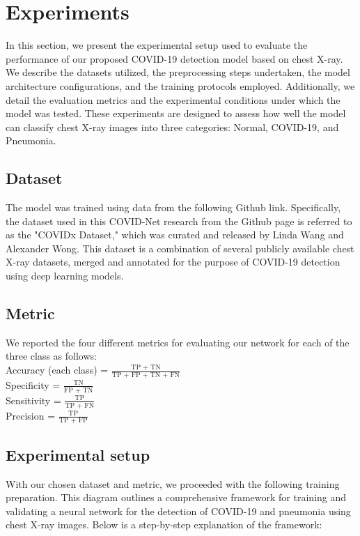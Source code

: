 \documentclass[12pt]{article}
\begin{document}
\section{Experiments}
In this section, we present the experimental setup used to evaluate the performance of our proposed COVID-19 detection model based on chest X-ray. We describe the datasets utilized, the preprocessing steps undertaken, the model architecture configurations, and the training protocols employed. Additionally, we detail the evaluation metrics and the experimental conditions under which the model was tested. These experiments are designed to assess how well the model can classify chest X-ray images into three categories: Normal, COVID-19, and Pneumonia.

\subsection{Dataset}
The model was trained using data from the following Github link. Specifically, the dataset used in this COVID-Net research from the Github page is referred to as the "COVIDx Dataset," which was curated and released by Linda Wang and Alexander Wong. This dataset is a combination of several publicly available chest X-ray datasets, merged and annotated for the purpose of COVID-19 detection using deep learning models.

\subsection{Metric}
We reported the four different metrics for evaluating our network for each of the three class as follows:\\
Accuracy (each class) = \begin{math}\frac{\text{TP + TN}}{\text{TP + FP + TN + FN}}\end{math}\\
Specificity = \begin{math}\frac{\text{TN}}{\text{FP + TN}}\end{math}\\
Sensitivity = \begin{math}\frac{\text{TP}}{\text{TP + FN}}\end{math}\\
Precision = \begin{math}\frac{\text{TP}}{\text{TP + FP}}\end{math}\\

\subsection{Experimental setup}
With our chosen dataset and metric, we proceeded with the following training preparation. This diagram outlines a comprehensive framework for training and validating a neural network for the detection of COVID-19 and pneumonia using chest X-ray images. Below is a step-by-step explanation of the framework:
\end{document}
